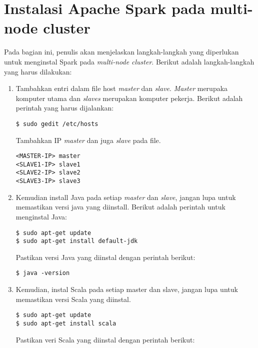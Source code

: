 \section{Instalasi Apache Spark pada multi-node cluster}

Pada bagian ini, penulis akan menjelaskan langkah-langkah yang diperlukan untuk menginstal Spark pada\textit{ multi-node cluster}. Berikut adalah langkah-langkah yang harus dilakukan:

\begin{enumerate}

\item Tambahkan entri dalam file host \textit{master} dan \textit{slave}. \textit{Master} merupaka komputer utama dan \textit{slaves} merupakan komputer pekerja. Berikut adalah perintah yang harus dijalankan: 

\begin{verbatim}
$ sudo gedit /etc/hosts
\end{verbatim}

Tambahkan IP \textit{master} dan juga \textit{slave} pada file.

\begin{verbatim}
<MASTER-IP> master
<SLAVE1-IP> slave1
<SLAVE2-IP> slave2
<SLAVE3-IP> slave3
\end{verbatim}

\item Kemudian install Java pada setiap \textit{master} dan \textit{slave}, jangan lupa untuk memastikan versi java yang diinstall. Berikut adalah perintah untuk menginstal Java:

\begin{verbatim}
$ sudo apt-get update
$ sudo apt-get install default-jdk
\end{verbatim}

Pastikan versi Java yang diinstal dengan perintah berikut:

\begin{verbatim}
$ java -version
\end{verbatim}

\item Kemudian, instal Scala pada setiap master dan slave, jangan lupa untuk memastikan versi Scala yang diinstal.

\begin{verbatim}
$ sudo apt-get update
$ sudo apt-get install scala
\end{verbatim}

Pastikan veri Scala yang diinstal dengan perintah berikut:


\end{enumerate}
